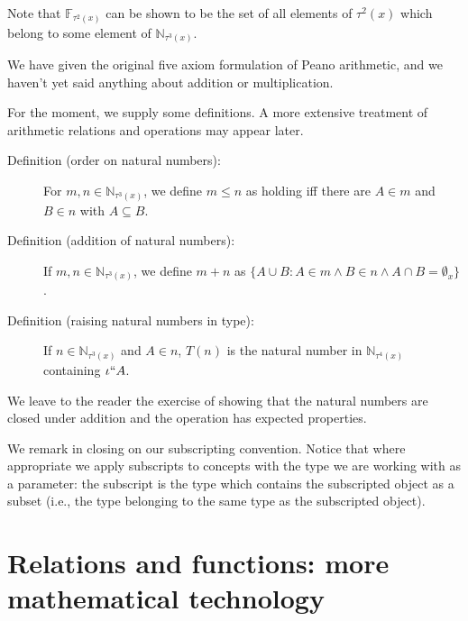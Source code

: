 \documentclass[12pt]{article}
\begin{document}
\begin{description}
\begin{enumerate}
\end{enumerate}

Note that $\mathbb F_{\tau^2(x)}$ can be shown to be the set of all elements of $\tau^2(x)$ which belong to some element of $\mathbb N_{\tau^3(x)}$.

We have given the original five axiom formulation of Peano arithmetic, and we haven't yet said anything about addition or multiplication.


For the moment, we supply some definitions.  A more extensive treatment of arithmetic relations and operations may appear later.

\begin{description}

\item[Definition (order on natural numbers):]  For $m,n \in \mathbb N_{\tau^3(x)}$, we define $m \leq n$ as holding iff
there are $A \in m$ and $B \in n$ with $A \subseteq B$.

\item[Definition (addition of natural numbers):]  If $m,n \in \mathbb N_{\tau^3(x)}$, we define $m+n$ as $\{A \cup B:A \in m \wedge B \in n \wedge A \cap B = \emptyset_x\}$.

\item[Definition (raising natural numbers in type):]  If $n \in \mathbb N_{\tau^3(x)}$ and $A \in n$, $T(n)$ is the natural number in $\mathbb N_{\tau^4(x)}$ containing $\iota``A$.

\end{description}

We leave to the reader the exercise of showing that the natural numbers are closed under addition and the operation has expected properties.

We remark in closing on our subscripting convention.  Notice that where appropriate we apply subscripts to concepts
with the type we are working with as a parameter:  the subscript is the type which contains the subscripted object as a subset (i.e., the type belonging to the same type as the subscripted object).

\end{description}

\section{Relations and functions:  more mathematical technology}
\end{document}
